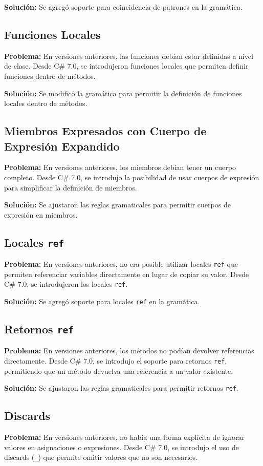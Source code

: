 \textbf{Solución:} Se agregó soporte para coincidencia de patrones en la gramática.

\subsection{Funciones Locales}
\textbf{Problema:} En versiones anteriores, las funciones debían estar definidas a nivel de clase. Desde C\# 7.0, se introdujeron funciones locales que permiten definir funciones dentro de métodos.

\textbf{Solución:} Se modificó la gramática para permitir la definición de funciones locales dentro de métodos.

\subsection{Miembros Expresados con Cuerpo de Expresión Expandido}
\textbf{Problema:} En versiones anteriores, los miembros debían tener un cuerpo completo. Desde C\# 7.0, se introdujo la posibilidad de usar cuerpos de expresión para simplificar la definición de miembros.

\textbf{Solución:} Se ajustaron las reglas gramaticales para permitir cuerpos de expresión en miembros.

\subsection{Locales \texttt{ref}}
\textbf{Problema:} En versiones anteriores, no era posible utilizar locales \texttt{ref} que permiten referenciar variables directamente en lugar de copiar su valor. Desde C\# 7.0, se introdujeron los locales \texttt{ref}.

\textbf{Solución:} Se agregó soporte para locales \texttt{ref} en la gramática.

\subsection{Retornos \texttt{ref}}
\textbf{Problema:} En versiones anteriores, los métodos no podían devolver referencias directamente. Desde C\# 7.0, se introdujo el soporte para retornos \texttt{ref}, permitiendo que un método devuelva una referencia a un valor existente.

\textbf{Solución:} Se ajustaron las reglas gramaticales para permitir retornos \texttt{ref}.

\subsection{Discards}
\textbf{Problema:} En versiones anteriores, no había una forma explícita de ignorar valores en asignaciones o expresiones. Desde C\# 7.0, se introdujo el uso de discards (\texttt{\_}) que permite omitir valores que no son necesarios.

